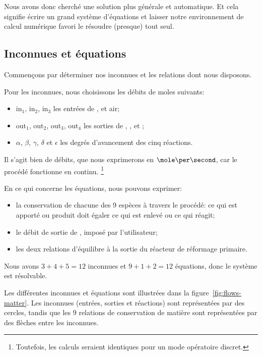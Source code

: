 \documentclass[a4paper,12pt]{article}
\begin{document}
Nous avons donc cherché une solution plus générale et automatique.
Et cela signifie écrire un grand système d'équations et laisser notre environnement
de calcul numérique favori le résoudre (presque) tout seul.

\subsection{Inconnues et équations}

Commençons par déterminer nos inconnues et les relations dont nous disposons.

Pour les inconnues, nous choisissons les débits de moles suivants:
\begin{itemize}
    \item $\mathrm{in}_1$, $\mathrm{in}_2$, $\mathrm{in}_3$
        les entrées de ,  et air;
    \item $\mathrm{out}_1$, $\mathrm{out}_2$, $\mathrm{out}_3$,
        $\mathrm{out}_4$ les sorties de , ,  et ;
    \item $\alpha$, $\beta$, $\gamma$, $\delta$ et $\epsilon$
        les degrés d'avancement des cinq réactions.
\end{itemize}
Il s'agit bien de débits, que nous exprimerons en $\mole\per\second$,
car le procédé fonctionne en continu.%
\footnote{Toutefois, les calculs seraient identiques
pour un mode opératoire discret.}

En ce qui concerne les équations, nous pouvons exprimer:
\begin{itemize}
    \item la conservation de chacune des 9 espèces à travers le procédé:
        ce qui est apporté ou produit doit égaler ce qui est enlevé ou ce qui réagit;
    \item le débit de sortie de , imposé par l'utilisateur;
    \item les deux relations d'équilibre à la sortie du réacteur de réformage
        primaire.
\end{itemize}

Nous avons $3+4+5 = 12$ inconnues et $9+1+2 = 12$ équations,
donc le système est résolvable.

Les différentes inconnues et équations sont illustrées dans
la figure~\ref{fig:flows-matter}.
Les inconnues (entrées, sorties et réactions) sont représentées par des cercles,
tandis que les 9 relations de conservation de matière
sont représentées par des flèches entre les inconnues.
\end{document}
